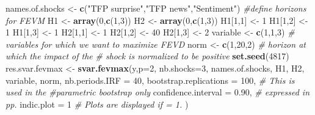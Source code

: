 \documentclass[
  11pt,
]{book}
\newenvironment{Shaded}{\begin{snugshade}}{\end{snugshade}}
\newcommand{\AttributeTok}[1]{\textcolor[rgb]{0.13,0.29,0.53}{#1}}
\newcommand{\CommentTok}[1]{\textcolor[rgb]{0.56,0.35,0.01}{\textit{#1}}}
\newcommand{\DecValTok}[1]{\textcolor[rgb]{0.00,0.00,0.81}{#1}}
\newcommand{\FloatTok}[1]{\textcolor[rgb]{0.00,0.00,0.81}{#1}}
\newcommand{\FunctionTok}[1]{\textcolor[rgb]{0.13,0.29,0.53}{\textbf{#1}}}
\newcommand{\NormalTok}[1]{#1}
\newcommand{\OtherTok}[1]{\textcolor[rgb]{0.56,0.35,0.01}{#1}}
\newcommand{\StringTok}[1]{\textcolor[rgb]{0.31,0.60,0.02}{#1}}
\theoremstyle{definition}
\theoremstyle{definition}
\theoremstyle{definition}
\theoremstyle{definition}
\theoremstyle{remark}
\begin{document}
\begin{Shaded}
\begin{Highlighting}[]
\NormalTok{names.of.shocks }\OtherTok{\textless{}{-}} \FunctionTok{c}\NormalTok{(}\StringTok{"TFP surprise"}\NormalTok{,}\StringTok{"TFP news"}\NormalTok{,}\StringTok{"Sentiment"}\NormalTok{)}
\CommentTok{\#define horizons for FEVM}
\NormalTok{H1 }\OtherTok{\textless{}{-}} \FunctionTok{array}\NormalTok{(}\DecValTok{0}\NormalTok{,}\FunctionTok{c}\NormalTok{(}\DecValTok{1}\NormalTok{,}\DecValTok{3}\NormalTok{))}
\NormalTok{H2 }\OtherTok{\textless{}{-}} \FunctionTok{array}\NormalTok{(}\DecValTok{0}\NormalTok{,}\FunctionTok{c}\NormalTok{(}\DecValTok{1}\NormalTok{,}\DecValTok{3}\NormalTok{))}
\NormalTok{H1[}\DecValTok{1}\NormalTok{,}\DecValTok{1}\NormalTok{] }\OtherTok{\textless{}{-}} \DecValTok{1}
\NormalTok{H1[}\DecValTok{1}\NormalTok{,}\DecValTok{2}\NormalTok{] }\OtherTok{\textless{}{-}} \DecValTok{1}
\NormalTok{H1[}\DecValTok{1}\NormalTok{,}\DecValTok{3}\NormalTok{] }\OtherTok{\textless{}{-}} \DecValTok{1}
\NormalTok{H2[}\DecValTok{1}\NormalTok{,}\DecValTok{1}\NormalTok{] }\OtherTok{\textless{}{-}} \DecValTok{1}
\NormalTok{H2[}\DecValTok{1}\NormalTok{,}\DecValTok{2}\NormalTok{] }\OtherTok{\textless{}{-}} \DecValTok{40}
\NormalTok{H2[}\DecValTok{1}\NormalTok{,}\DecValTok{3}\NormalTok{] }\OtherTok{\textless{}{-}} \DecValTok{2}
\NormalTok{variable }\OtherTok{\textless{}{-}} \FunctionTok{c}\NormalTok{(}\DecValTok{1}\NormalTok{,}\DecValTok{1}\NormalTok{,}\DecValTok{3}\NormalTok{) }\CommentTok{\# variables for which we want to maximize FEVD}
\NormalTok{norm }\OtherTok{\textless{}{-}} \FunctionTok{c}\NormalTok{(}\DecValTok{1}\NormalTok{,}\DecValTok{20}\NormalTok{,}\DecValTok{2}\NormalTok{) }\CommentTok{\# horizon at which the impact of the}
\CommentTok{\# shock is normalized to be positive}
\FunctionTok{set.seed}\NormalTok{(}\DecValTok{4817}\NormalTok{)}
\NormalTok{res.svar.fevmax }\OtherTok{\textless{}{-}}
  \FunctionTok{svar.fevmax}\NormalTok{(y,}\AttributeTok{p=}\DecValTok{2}\NormalTok{,}
              \AttributeTok{nb.shocks=}\DecValTok{3}\NormalTok{,}
\NormalTok{              names.of.shocks,}
\NormalTok{              H1,}
\NormalTok{              H2,}
\NormalTok{              variable,}
\NormalTok{              norm,}
              \AttributeTok{nb.periods.IRF =} \DecValTok{40}\NormalTok{,}
              \AttributeTok{bootstrap.replications =} \DecValTok{100}\NormalTok{, }\CommentTok{\# This is used in the}
              \CommentTok{\#parametric bootstrap only}
              \AttributeTok{confidence.interval =} \FloatTok{0.90}\NormalTok{, }\CommentTok{\# expressed in pp.}
              \AttributeTok{indic.plot =} \DecValTok{1} \CommentTok{\# Plots are displayed if = 1.}
\NormalTok{  )}
\end{Highlighting}
\end{Shaded}
\end{document}
